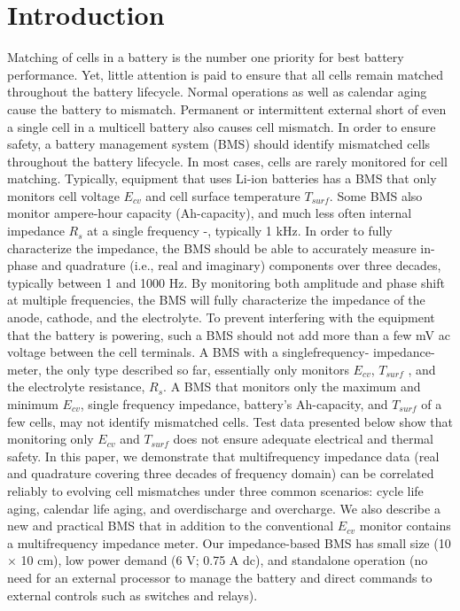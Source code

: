 \chapter{Introduction}

\hspace{0.5cm} 
Matching of cells in a battery is the number one priority for best battery performance. Yet, little attention is paid to ensure that all cells remain matched throughout the battery lifecycle. Normal operations as well as calendar aging cause the battery to mismatch. Permanent or intermittent external short of even a single cell in a multicell battery also causes cell mismatch. In order to ensure safety, a battery management system (BMS) should identify mismatched cells throughout the battery lifecycle. In most cases, cells are rarely monitored for cell matching. Typically, equipment that uses Li-ion batteries has a BMS that only monitors cell voltage $E_{cv}$ and cell surface temperature $T_{surf}$\cite{dey2016sensor}. Some BMS also monitor ampere-hour capacity (Ah-capacity)\cite{giegerich2016open}, and much less often internal impedance $R_s$ at a single frequency \cite{taylor2012system} -\cite{waag2014critical}, typically 1 kHz. In order to fully characterize the impedance, the BMS should be able to accurately measure in-phase and quadrature (i.e., real and imaginary) components over three decades, typically between 1 and 1000 Hz. By monitoring both amplitude and phase shift at multiple frequencies, the BMS will fully characterize the impedance of the anode, cathode, and the electrolyte. To prevent interfering with the equipment that the battery is powering, such a BMS should not add more than a few mV ac voltage between the cell terminals. A BMS with a singlefrequency- impedance-meter, the only type described so far, essentially only monitors $E_{cv}$, $T_{surf}$ , and the electrolyte resistance, $R_s$. A BMS that monitors only the maximum and minimum $E_{cv}$, single frequency impedance, battery’s Ah-capacity, and $T_{surf}$ of a few cells, may not identify mismatched cells. Test data presented below show that monitoring only $E_{cv}$ and $T_{surf}$ does not ensure adequate electrical and thermal safety. In this paper, we demonstrate that multifrequency impedance data (real and quadrature covering three decades of frequency domain) can be correlated reliably to evolving cell mismatches under three common scenarios: cycle life aging, calendar life aging, and overdischarge and overcharge. We also describe a new and practical BMS that in addition to the conventional $E_{cv}$ monitor contains a multifrequency impedance meter. Our impedance-based BMS has small size (10 × 10 cm), low power demand (6 V; 0.75 A dc), and standalone operation (no need for an external processor to manage the battery and direct commands to external controls such as switches and relays).

